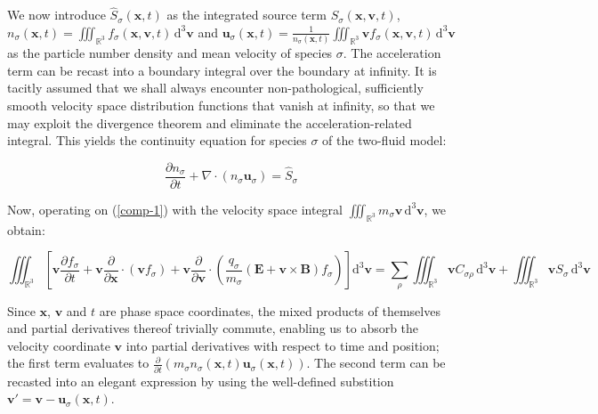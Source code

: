 We now introduce $\hat{S}_\sigma(\mathbf{x},t)$ as the integrated source term $S_\sigma(\mathbf{x},\mathbf{v},t)$, $n_\sigma(\mathbf{x},t)=\iiint_{\mathbb{R}^3}f_\sigma(\mathbf{x},\mathbf{v},t)\,\mathrm{d}^3 \mathbf{v}$ and $\mathbf{u}_\sigma(\mathbf{x},t)=\frac{1}{n_\sigma(\mathbf{x},t)}\iiint_{\mathbb{R}^3}\mathbf{v}f_\sigma(\mathbf{x},\mathbf{v},t)\,\mathrm{d}^3 \mathbf{v}$ as the particle number density and mean velocity of species $\sigma$. The acceleration term can be recast into a boundary integral over the boundary at infinity. It is tacitly assumed that we shall always encounter non-pathological, sufficiently smooth velocity space distribution functions that vanish at infinity, so that we may exploit the divergence theorem and eliminate the acceleration-related integral. This yields the continuity equation for species $\sigma$ of the two-fluid model:

\begin{equation}
    \label{comp-7}
    \frac{\partial n_\sigma}{\partial t}+\nabla\cdot \left(n_\sigma\mathbf{u}_\sigma\right)=\hat{S}_\sigma
\end{equation}

Now, operating on (\ref{comp-1}) with the velocity space integral $\iiint_{\mathbb{R}^3}m_\sigma \mathbf{v}\,\mathrm{d}^3 \mathbf{v}$, we obtain:

\begin{equation*}
    \label{comp-8}
    \iiint_{\mathbb{R}^3}\left[\mathbf{v}\frac{\partial f_\sigma}{\partial t}+\mathbf{v}\frac{\partial}{\partial \mathbf{x}}\cdot \left(\mathbf{v}f_\sigma\right)+\mathbf{v}\frac{\partial}{\partial \mathbf{v}}\cdot \left(\frac{q_\sigma}{m_\sigma}\left(\mathbf{E}+\mathbf{v}\times \mathbf{B}\right)f_\sigma\right)\right]\mathrm{d}^3 \mathbf{v}=\sum_{\rho}\iiint_{\mathbb{R}^3} \mathbf{v} C_{\sigma\rho}\,\mathrm{d}^3 \mathbf{v}+\iiint_{\mathbb{R}^3} \mathbf{v}S_\sigma\,\mathrm{d}^3 \mathbf{v}
\end{equation*}

Since $\mathbf{x}$, $\mathbf{v}$ and $t$ are phase space coordinates, the mixed products of themselves and partial derivatives thereof trivially commute, enabling us to absorb the velocity coordinate $\mathbf{v}$ into partial derivatives with respect to time and position; the first term evaluates to $\frac{\partial}{\partial t}\left(m_\sigma n_\sigma(\mathbf{x},t)\mathbf{u}_\sigma(\mathbf{x},t)\right)$. The second term can be recasted into an elegant expression by using the well-defined substition $\mathbf{v}'=\mathbf{v}-\mathbf{u}_\sigma(\mathbf{x},t)$.

